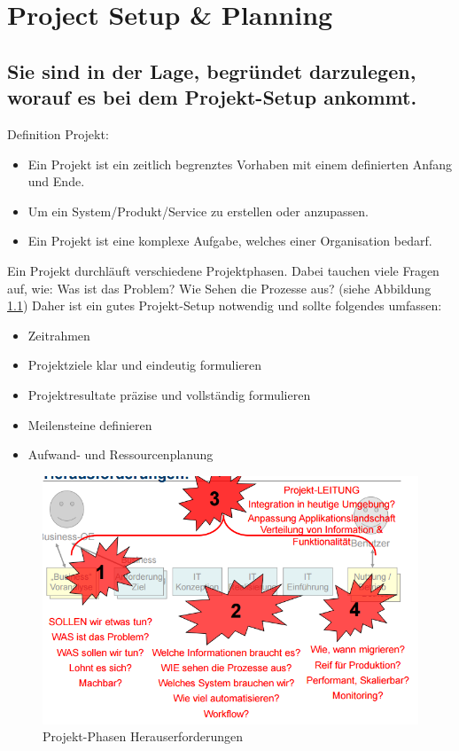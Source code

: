 \chapter{Project Setup \& Planning}

\section{Sie sind in der Lage, begründet darzulegen, worauf es bei dem Projekt-Setup ankommt.}

Definition Projekt:
\begin{itemize}
	\item Ein Projekt ist ein zeitlich begrenztes Vorhaben mit einem definierten Anfang und Ende.
	\item Um ein System/Produkt/Service zu erstellen oder anzupassen.
	\item Ein Projekt ist eine komplexe Aufgabe, welches einer Organisation bedarf.
\end{itemize}

Ein Projekt durchläuft verschiedene Projektphasen. Dabei tauchen viele Fragen auf, wie: Was ist das Problem? Wie Sehen die Prozesse aus? (siehe Abbildung \ref{fig:projekt-phasen-herauserforderungen})  Daher ist ein gutes Projekt-Setup notwendig und sollte folgendes umfassen:

\begin{itemize}
	\item Zeitrahmen
	\item Projektziele klar und eindeutig formulieren
	\item Projektresultate präzise und vollständig formulieren
	\item Meilensteine definieren
	\item Aufwand- und Ressourcenplanung
\end{itemize}

\begin{figure}[h!]
\centering
\includegraphics[width=0.7\linewidth]{fig/projekt-phasen-herauserforderungen}
\caption{Projekt-Phasen Herauserforderungen}
\label{fig:projekt-phasen-herauserforderungen}
\end{figure}

